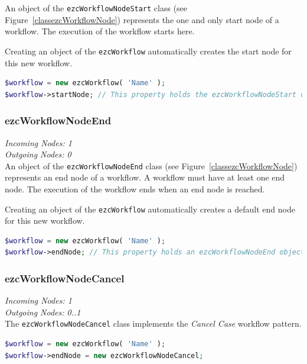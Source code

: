 An object of the \texttt{ezcWorkflowNodeStart} class (see
Figure~\ref{classezcWorkflowNode}) represents the one and only start node of a
workflow. The execution of the workflow starts here.

Creating an object of the \texttt{ezcWorkflow} automatically creates the
start node for this new workflow.

\begin{lstlisting}[language=PHP]
$workflow = new ezcWorkflow( 'Name' );
$workflow->startNode; // This property holds the ezcWorkflowNodeStart object.
\end{lstlisting}

\subsubsection{ezcWorkflowNodeEnd}

\emph{Incoming Nodes: 1}\\
\emph{Outgoing Nodes: 0}\\

An object of the \texttt{ezcWorkflowNodeEnd} class (see
Figure~\ref{classezcWorkflowNode}) represents an end node of a workflow. A
workflow must have at least one end node. The execution of the workflow ends
when an end node is reached.

Creating an object of the \texttt{ezcWorkflow} automatically creates a default
end node for this new workflow.

\begin{lstlisting}[language=PHP]
$workflow = new ezcWorkflow( 'Name' );
$workflow->endNode; // This property holds an ezcWorkflowNodeEnd object.
\end{lstlisting}

\subsubsection{ezcWorkflowNodeCancel}

\emph{Incoming Nodes: 1}\\
\emph{Outgoing Nodes: 0..1}\\

The \texttt{ezcWorkflowNodeCancel} class implements the
\emph{Cancel Case} workflow pattern.

\begin{lstlisting}[language=PHP]
$workflow = new ezcWorkflow( 'Name' );
$workflow->endNode = new ezcWorkflowNodeCancel;
\end{lstlisting}

